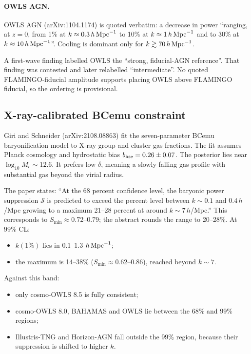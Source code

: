 \documentclass[11pt,a4paper]{article}
\begin{document}
\paragraph{OWLS AGN.} OWLS AGN (arXiv:1104.1174) is quoted verbatim: a decrease in power ``ranging, at $z = 0$, from 1\% at $k \approx 0.3\,h\,{\rm Mpc}^{-1}$ to 10\% at $k \approx 1\,h\,{\rm Mpc}^{-1}$ and to 30\% at $k \approx 10\,h\,{\rm Mpc}^{-1}$''. Cooling is dominant only for $k\gtrsim70\,h\,{\rm Mpc}^{-1}$.

A first-wave finding labelled OWLS the ``strong, fiducial-AGN reference''. That finding was contested and later relabelled ``intermediate''. No quoted FLAMINGO-fiducial amplitude supports placing OWLS above FLAMINGO fiducial, so the ordering is provisional.

\subsection{X-ray-calibrated BCemu constraint}
Giri and Schneider (arXiv:2108.08863) fit the seven-parameter BCemu baryonification model to X-ray group and cluster gas fractions. The fit assumes Planck cosmology and hydrostatic bias $b_{\rm hse}=0.26\pm0.07$. The posterior lies near $\log_{10}M_c\sim12.6$. It prefers low $\delta$, meaning a slowly falling gas profile with substantial gas beyond the virial radius.

The paper states: ``At the 68 percent confidence level, the baryonic power suppression $\mathcal{S}$ is predicted to exceed the percent level between $k\sim0.1$ and $0.4\,h$/Mpc growing to a maximum 21--28 percent at around $k\sim7\,h$/Mpc.'' This corresponds to $S_{\min}\approx0.72$--$0.79$; the abstract rounds the range to 20--28\%. At 99\% CL:
\begin{itemize}
\item $k(1\%)$ lies in 0.1--1.3 $h\,{\rm Mpc}^{-1}$;
\item the maximum is 14--38\% ($S_{\min}\approx0.62$--$0.86$), reached beyond $k\sim7$.
\end{itemize}

Against this band:
\begin{itemize}
\item only cosmo-OWLS 8.5 is fully consistent;
\item cosmo-OWLS 8.0, BAHAMAS and OWLS lie between the 68\% and 99\% regions;
\item Illustris-TNG and Horizon-AGN fall outside the 99\% region, because their suppression is shifted to higher $k$.
\end{itemize}
\end{document}
